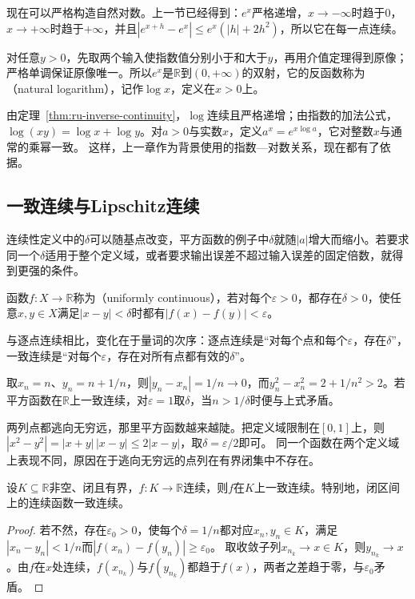现在可以严格构造自然对数。上一节已经得到：$e^x$严格递增，$x\to-\infty$时趋于$0$，$x\to+\infty$时趋于$+\infty$，并且$|e^{x+h}-e^x|\leq e^x(|h|+2h^2)$，所以它在每一点连续。

对任意$y>0$，先取两个输入使指数值分别小于和大于$y$，再用介值定理得到原像；严格单调保证原像唯一。所以$e^x$是$\mathbb R$到$(0,+\infty)$的双射，它的反函数称为（natural logarithm），记作$\log x$，定义在$x>0$上。

由定理~\ref{thm:ru-inverse-continuity}，$\log$连续且严格递增；由指数的加法公式，$\log(xy)=\log x+\log y$。对$a>0$与实数$x$，定义$a^x=e^{x\log a}$，它对整数$x$与通常的乘幂一致。
这样，上一章作为背景使用的指数—对数关系，现在都有了依据。

\subsection{一致连续与Lipschitz连续}
\label{sec:ru-uniform-lipschitz}
\label{sec:analysis-continuity-relations}

连续性定义中的$\delta$可以随基点改变，平方函数的例子中$\delta$就随$|a|$增大而缩小。若要求同一个$\delta$适用于整个定义域，或者要求输出误差不超过输入误差的固定倍数，就得到更强的条件。
\begin{definition}[一致连续]
\label{def:analysis-uniform-continuity}
函数$f:X\to\mathbb R$称为（uniformly continuous），若对每个$\varepsilon>0$，都存在$\delta>0$，使任意$x,y\in X$满足$|x-y|<\delta$时都有$|f(x)-f(y)|<\varepsilon$。
\end{definition}
与逐点连续相比，变化在于量词的次序：逐点连续是“对每个点和每个$\varepsilon$，存在$\delta$”，一致连续是“对每个$\varepsilon$，存在对所有点都有效的$\delta$”。
\begin{example}[平方函数在实轴上不一致连续]
\label{ex:analysis-square-not-uniformly-continuous}
取$x_n=n$、$y_n=n+1/n$，则$|y_n-x_n|=1/n\to0$，而$y_n^2-x_n^2=2+1/n^2>2$。若平方函数在$\mathbb R$上一致连续，对$\varepsilon=1$取$\delta$，当$n>1/\delta$时便与上式矛盾。
\end{example}
两列点都逃向无穷远，那里平方函数越来越陡。把定义域限制在$[0,1]$上，则$|x^2-y^2|=|x+y|\,|x-y|\leq2|x-y|$，取$\delta=\varepsilon/2$即可。
同一个函数在两个定义域上表现不同，原因在于逃向无穷远的点列在有界闭集中不存在。
\begin{theorem}[一致连续性定理]
\label{thm:analysis-uniform-continuity}
设$K\subseteq\mathbb R$非空、闭且有界，$f:K\to\mathbb R$连续，则$f$在$K$上一致连续。特别地，闭区间上的连续函数一致连续。
\end{theorem}
\begin{proof}
若不然，存在$\varepsilon_0>0$，使每个$\delta=1/n$都对应$x_n,y_n\in K$，满足$|x_n-y_n|<1/n$而$|f(x_n)-f(y_n)|\geq\varepsilon_0$。
取收敛子列$x_{n_k}\to x\in K$，则$y_{n_k}\to x$。由$f$在$x$处连续，$f(x_{n_k})$与$f(y_{n_k})$都趋于$f(x)$，两者之差趋于零，与$\varepsilon_0$矛盾。
\end{proof}

